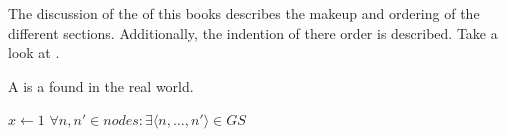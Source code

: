 \documentclass[crop=false,class=scrbook]{standalone}
\begin{document}
The discussion of the  of this books describes the makeup and ordering
of the different sections.
Additionally, the indention of there order is described.
Take a look at .

\begin{defn}
	A  is a  found in the real world.
\end{defn}

\begin{algorithm}
\begin{algorithmic}
   \State \(x \leftarrow 1\)
   \Return \(\forall n,n' \in nodes : \exists \langle n, \dots, n' \rangle \in GS\)
\EndProcedure
\end{algorithmic}
\end{algorithm}
\end{document}

